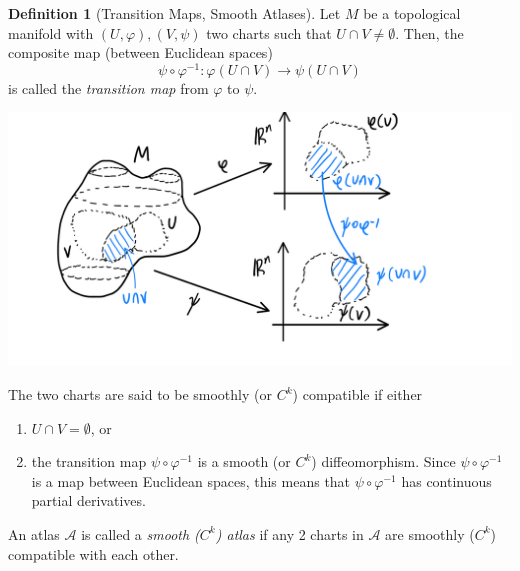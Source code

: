 \documentclass{article}
\theoremstyle{remark}
\theoremstyle{definition}
\newtheorem{definition}{Definition}[section]
\begin{document}
\begin{definition}[Transition Maps, Smooth Atlases]
Let $M$ be a topological manifold with $(U, \varphi), (V, \psi)$ two charts such that $U \cap V \neq \emptyset$. Then, the composite map (between Euclidean spaces)
\[\psi \circ \varphi^{-1} : \varphi(U \cap V) \longrightarrow \psi(U \cap V)\]
is called the \textit{transition map} from $\varphi$ to $\psi$. 
\begin{center}
    \includegraphics[scale=0.27]{img/Transition_Map.PNG}
\end{center}
The two charts are said to be smoothly (or $C^k$) compatible if either 
\begin{enumerate}
    \item $U \cap V = \emptyset$, or
    \item the transition map $\psi \circ \varphi^{-1}$ is a smooth (or $C^k$) diffeomorphism. Since $\psi \circ \varphi^{-1}$ is a map between Euclidean spaces, this means that $\psi \circ \varphi^{-1}$ has continuous partial derivatives. 
\end{enumerate}
An atlas $\mathcal{A}$ is called a \textit{smooth ($C^k$) atlas} if any 2 charts in $\mathcal{A}$ are smoothly ($C^k$) compatible with each other. 
\end{definition}
\end{document}
